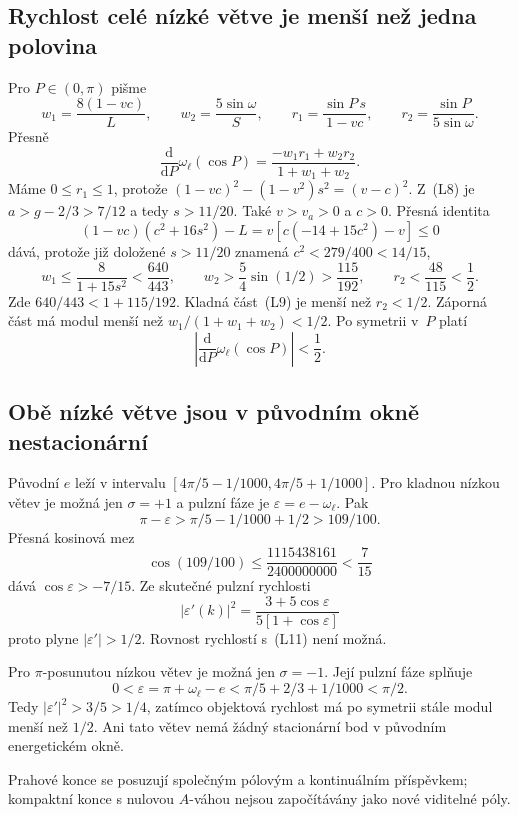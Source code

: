 \documentclass[11pt,a4paper]{article}
\theoremstyle{remark}\newtheorem{remark}[theorem]{Poznámka}
\numberwithin{equation}{section}
\begin{document}
\subsection{Rychlost celé nízké větve je menší než jedna polovina}

Pro \(P\in(0,\pi)\) pišme
\[
w_1=\frac{8(1-vc)}L,\qquad w_2=\frac{5\sin\omega}S,
\qquad r_1=\frac{\sin P\,s}{1-vc},\qquad
r_2=\frac{\sin P}{5\sin\omega}.
\]
Přesně
\[
\frac{\mathrm d}{\mathrm dP}\omega_\ell(\cos P)
=\frac{-w_1r_1+w_2r_2}{1+w_1+w_2}.
\tag{L9}
\]
Máme \(0\le r_1\le1\), protože
\((1-vc)^2-(1-v^2)s^2=(v-c)^2\). Z~(L8) je
\(a>g-2/3>7/12\) a tedy \(s>11/20\). Také
\(v>v_a>0\) a \(c>0\). Přesná identita
\[
(1-vc)(c^2+16s^2)-L
=v[c(-14+15c^2)-v]\le0
\]
dává, protože již doložené \(s>11/20\) znamená
\(c^2<279/400<14/15\),
\[
w_1\le\frac8{1+15s^2}<\frac{640}{443},\qquad
w_2>\frac54\sin(1/2)>\frac{115}{192},\qquad
r_2<\frac{48}{115}<\frac12.
\tag{L10}
\]
Zde \(640/443<1+115/192\). Kladná část~(L9) je menší než
\(r_2<1/2\). Záporná část má modul menší než
\(w_1/(1+w_1+w_2)<1/2\). Po symetrii v~\(P\) platí
\[
\boxed{\left|\frac{\mathrm d}{\mathrm dP}
\omega_\ell(\cos P)\right|<\frac12.}
\tag{L11}
\]

\subsection{Obě nízké větve jsou v původním okně nestacionární}

Původní \(e\) leží v intervalu
\([4\pi/5-1/1000,4\pi/5+1/1000]\). Pro kladnou nízkou
větev je možná jen \(\sigma=+1\) a pulzní fáze je
\(\varepsilon=e-\omega_\ell\). Pak
\[
\pi-\varepsilon>\pi/5-1/1000+1/2>109/100.
\]
Přesná kosinová mez
\[
\cos(109/100)\le
\frac{1115438161}{2400000000}<\frac7{15}
\]
dává \(\cos\varepsilon>-7/15\). Ze skutečné pulzní rychlosti
\[
|\varepsilon'(k)|^2
=\frac{3+5\cos\varepsilon}{5[1+\cos\varepsilon]}
\]
proto plyne \(|\varepsilon'|>1/2\). Rovnost rychlostí
s~(L11) není možná.

Pro \(\pi\)-posunutou nízkou větev je možná jen
\(\sigma=-1\). Její pulzní fáze splňuje
\[
0<\varepsilon=\pi+\omega_\ell-e
<\pi/5+2/3+1/1000<\pi/2.
\]
Tedy \(|\varepsilon'|^2>3/5>1/4\), zatímco objektová
rychlost má po symetrii stále modul menší než \(1/2\). Ani
tato větev nemá žádný stacionární bod v původním energetickém
okně.

Prahové konce se posuzují společným pólovým a kontinuálním
příspěvkem; kompaktní konce s nulovou \(A\)-váhou nejsou
započítávány jako nové viditelné póly.
\end{document}
